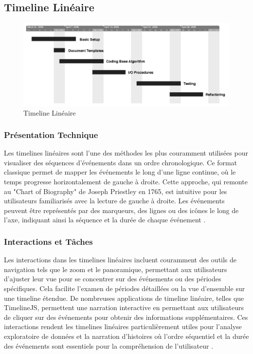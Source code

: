 \documentclass[runningheads]{llncs}
\begin{document}
\subsection{Timeline Linéaire}
\begin{figure}
    \centering
    \includegraphics[width=1\linewidth]{assets/timeline_lineaire.png}
    \caption{Timeline Linéaire \cite{brehmer_timelines_2017}}
    \label{fig:enter-label}
\end{figure}

\subsubsection{Présentation Technique}
Les timelines linéaires sont l'une des méthodes les plus couramment utilisées pour visualiser des séquences d'événements dans un ordre chronologique. Ce format classique permet de mapper les événements le long d'une ligne continue, où le temps progresse horizontalement de gauche à droite. Cette approche, qui remonte au "Chart of Biography" de Joseph Priestley en 1765, est intuitive pour les utilisateurs familiarisés avec la lecture de gauche à droite. Les événements peuvent être représentés par des marqueurs, des lignes ou des icônes le long de l'axe, indiquant ainsi la séquence et la durée de chaque événement \cite{brehmer_timelines_2017}.

\subsubsection{Interactions et Tâches}
Les interactions dans les timelines linéaires incluent couramment des outils de navigation tels que le zoom et le panoramique, permettant aux utilisateurs d'ajuster leur vue pour se concentrer sur des événements ou des périodes spécifiques. Cela facilite l'examen de périodes détaillées ou la vue d'ensemble sur une timeline étendue. De nombreuses applications de timeline linéaire, telles que TimelineJS, permettent une narration interactive en permettant aux utilisateurs de cliquer sur des événements pour obtenir des informations supplémentaires. Ces interactions rendent les timelines linéaires particulièrement utiles pour l'analyse exploratoire de données et la narration d'histoires où l'ordre séquentiel et la durée des événements sont essentiels pour la compréhension de l'utilisateur \cite{brehmer_timelines_2017}.
\end{document}
